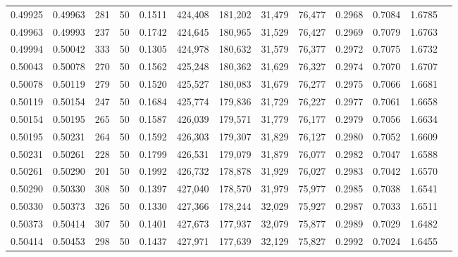 \begin{tabular}{rrrrrrrrrrrrr}
0.49925 & 0.49963 &   281 &  50 &                                     0.1511 & 424,408 & 181,202 &  31,479 &  76,477 & 0.2968 & 0.7084 & 1.6785 \\
0.49963 & 0.49993 &   237 &  50 &                                     0.1742 & 424,645 & 180,965 &  31,529 &  76,427 & 0.2969 & 0.7079 & 1.6763 \\
0.49994 & 0.50042 &   333 &  50 &                                     0.1305 & 424,978 & 180,632 &  31,579 &  76,377 & 0.2972 & 0.7075 & 1.6732 \\
0.50043 & 0.50078 &   270 &  50 &                                     0.1562 & 425,248 & 180,362 &  31,629 &  76,327 & 0.2974 & 0.7070 & 1.6707 \\
0.50078 & 0.50119 &   279 &  50 &                                     0.1520 & 425,527 & 180,083 &  31,679 &  76,277 & 0.2975 & 0.7066 & 1.6681 \\
0.50119 & 0.50154 &   247 &  50 &                                     0.1684 & 425,774 & 179,836 &  31,729 &  76,227 & 0.2977 & 0.7061 & 1.6658 \\
0.50154 & 0.50195 &   265 &  50 &                                     0.1587 & 426,039 & 179,571 &  31,779 &  76,177 & 0.2979 & 0.7056 & 1.6634 \\
0.50195 & 0.50231 &   264 &  50 &                                     0.1592 & 426,303 & 179,307 &  31,829 &  76,127 & 0.2980 & 0.7052 & 1.6609 \\
0.50231 & 0.50261 &   228 &  50 &                                     0.1799 & 426,531 & 179,079 &  31,879 &  76,077 & 0.2982 & 0.7047 & 1.6588 \\
0.50261 & 0.50290 &   201 &  50 &                                     0.1992 & 426,732 & 178,878 &  31,929 &  76,027 & 0.2983 & 0.7042 & 1.6570 \\
0.50290 & 0.50330 &   308 &  50 &                                     0.1397 & 427,040 & 178,570 &  31,979 &  75,977 & 0.2985 & 0.7038 & 1.6541 \\
0.50330 & 0.50373 &   326 &  50 &                                     0.1330 & 427,366 & 178,244 &  32,029 &  75,927 & 0.2987 & 0.7033 & 1.6511 \\
0.50373 & 0.50414 &   307 &  50 &                                     0.1401 & 427,673 & 177,937 &  32,079 &  75,877 & 0.2989 & 0.7029 & 1.6482 \\
0.50414 & 0.50453 &   298 &  50 &                                     0.1437 & 427,971 & 177,639 &  32,129 &  75,827 & 0.2992 & 0.7024 & 1.6455 \\

\end{tabular}
